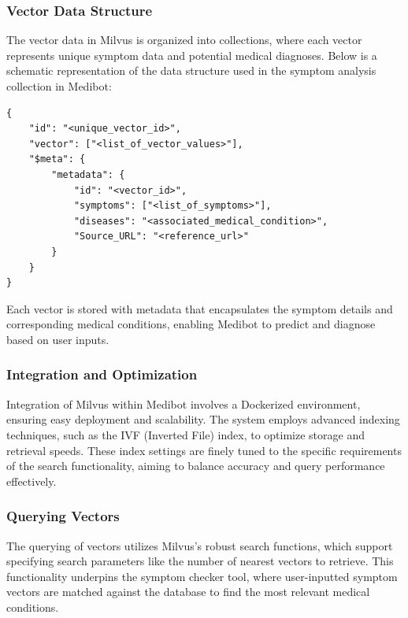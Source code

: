 \subsubsection{Vector Data Structure}
The vector data in Milvus is organized into collections, where each vector represents unique symptom data and potential medical diagnoses. Below is a schematic representation of the data structure used in the symptom analysis collection in Medibot:

\begin{verbatim}
{
    "id": "<unique_vector_id>",
    "vector": ["<list_of_vector_values>"],
    "$meta": {
        "metadata": {
            "id": "<vector_id>",
            "symptoms": ["<list_of_symptoms>"],
            "diseases": "<associated_medical_condition>",
            "Source_URL": "<reference_url>"
        }
    }
}
\end{verbatim}

Each vector is stored with metadata that encapsulates the symptom details and corresponding medical conditions, enabling Medibot to predict and diagnose based on user inputs.

\subsubsection{Integration and Optimization}
Integration of Milvus within Medibot involves a Dockerized environment, ensuring easy deployment and scalability. The system employs advanced indexing techniques, such as the IVF (Inverted File) index, to optimize storage and retrieval speeds. These index settings are finely tuned to the specific requirements of the search functionality, aiming to balance accuracy and query performance effectively.

\subsubsection{Querying Vectors}
The querying of vectors utilizes Milvus's robust search functions, which support specifying search parameters like the number of nearest vectors to retrieve. This functionality underpins the symptom checker tool, where user-inputted symptom vectors are matched against the database to find the most relevant medical conditions.

